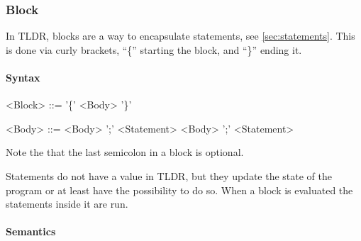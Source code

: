 \subsubsection{Block}
In TLDR, blocks are a way to encapsulate statements, see \cref{sec:statements}. This is done via curly brackets, \enquote{\{} starting the block, and \enquote{\}} ending it.

\paragraph{Syntax}

\begin{grammar}
<Block> ::= '\{' <Body> '\}'

<Body> ::= <Body> ';' <Statement>
 \alt <Body> ';'
 \alt <Statement>
\end{grammar}


Note the that the last semicolon in a block is optional.

Statements do not have a value in TLDR, but they update the state of the program or at least have the possibility to do so. When a block is evaluated the statements inside it are run.

\paragraph{Semantics}

